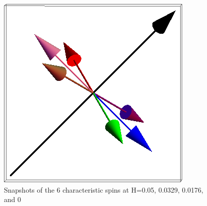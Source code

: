 \documentclass{article}
\begin{document}
\begin{figure}[ht]
\includegraphics[scale=0.27]{111_3000/501S005to000R.png}
\caption{Snapshots of the 6 characteristic spins at H=0.05, 0.0329, 0.0176, and 0}
\end{figure}
\clearpage
\end{document}
